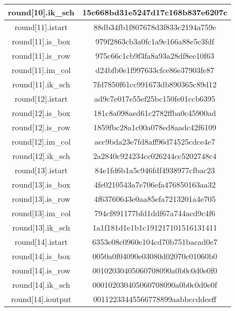 \begin{center}
\begin{longtable}{|c|c|}
\hline
round[10].ik\_sch&   15c668bd31e5247d17c168b837e6207c\\
\hline
round[11].istart&   88db34fb1f807678d3f833c2194a759e\\
\hline
round[11].is\_box&   979f2863cb3a0fc1a9e166a88e5c3fdf\\
\hline
round[11].is\_row&   975c66c1cb9f3fa8a93a28df8ee10f63\\
\hline
round[11].im\_col&   d24bfb0e1f997633cfce86e37903fe87\\
\hline
round[11].ik\_sch&   7fd7850f61cc991673db890365c89d12\\
\hline
round[12].istart&   ad9c7e017e55ef25bc150fe01ccb6395\\
\hline
round[12].is\_box&   181c8a098aed61c2782ffba0c45900ad\\
\hline
round[12].is\_row&   1859fbc28a1c00a078ed8aadc42f6109\\
\hline
round[12].im\_col&   aec9bda23e7fd8aff96d74525cdce4e7\\
\hline
round[12].ik\_sch&   2a2840c924234cc026244cc5202748c4\\
\hline
round[13].istart&   84e1fd6b1a5c946fdf4938977cfbac23\\
\hline
round[13].is\_box&   4fe0210543a7e706efa476850163aa32\\
\hline
round[13].is\_row&   4f63760643e0aa85efa7213201a4e705\\
\hline
round[13].im\_col&   794cf891177bfd1ddf67a744acd9c4f6\\
\hline
round[13].ik\_sch&   1a1f181d1e1b1c191217101516131411\\
\hline
round[14].istart&   6353e08c0960e104cd70b751bacad0e7\\
\hline
round[14].is\_box&   0050a0f04090e03080d02070c01060b0\\
\hline
round[14].is\_row&   00102030405060708090a0b0c0d0e0f0\\
\hline
round[14].ik\_sch&   000102030405060708090a0b0c0d0e0f\\
\hline
round[14].ioutput&  00112233445566778899aabbccddeeff\\
\hline
\end{longtable}
\end{center}